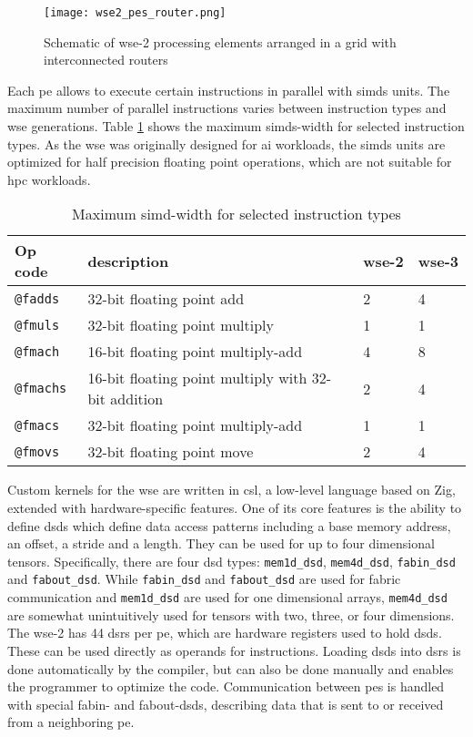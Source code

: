 \begin{figure}[h]
    \centering
    \texttt{[image: wse2\_pes\_router.png]}
    \caption{Schematic of \ac{wse}-2 processing elements arranged in a grid with interconnected routers \cite{lie2023cerebras}}
    \label{fig:wse2_pes_router}
\end{figure}

Each \ac{pe} allows to execute certain instructions in parallel with \acp{simd} units. The maximum number of parallel instructions varies between instruction types and \ac{wse} generations. Table \ref{tab:simd_operations} shows the maximum \acp{simd}-width for selected instruction types. As the \ac{wse} was originally designed for \ac{ai} workloads, the \acp{simd} units are optimized for half precision floating point operations, which are not suitable for \ac{hpc} workloads. 

\begin{table}[h]
    \centering
    \caption{Maximum \ac{simd}-width for selected instruction types}
    \label{tab:simd_operations}
    \begin{tabular}{@{}llll@{}}
        \toprule
        Op code & description & \ac{wse}-2 & \ac{wse}-3 \\
        \midrule
        \texttt{@fadds} & 32-bit floating point add & 2 & 4 \\
        \texttt{@fmuls} & 32-bit floating point multiply & 1 & 1 \\
        \texttt{@fmach} & 16-bit floating point multiply-add & 4 & 8 \\
        \texttt{@fmachs} & 16-bit floating point multiply with 32-bit addition & 2 & 4 \\
        \texttt{@fmacs} & 32-bit floating point multiply-add & 1 & 1 \\
        \texttt{@fmovs} & 32-bit floating point move & 2 & 4 \\
        \bottomrule
    \end{tabular}
\end{table}

Custom kernels for the \ac{wse} are written in \ac{csl}, a low-level language based on Zig, extended with hardware-specific features.
One of its core features is the ability to define \acp{dsd} which define data access patterns including a base memory address, an offset, a stride and a length. They can be used for up to four dimensional tensors. Specifically, there are four \ac{dsd} types: \texttt{mem1d\_dsd}, \texttt{mem4d\_dsd}, \texttt{fabin\_dsd} and \texttt{fabout\_dsd}. While \texttt{fabin\_dsd} and \texttt{fabout\_dsd} are used for fabric communication and \texttt{mem1d\_dsd} are used for one dimensional arrays, \texttt{mem4d\_dsd} are somewhat unintuitively used for tensors with two, three, or four dimensions. The \ac{wse}-2 has 44 \acp{dsr} per \ac{pe}, which are hardware registers used to hold \acp{dsd}. These can be used directly as operands for instructions. Loading \acp{dsd} into \acp{dsr} is done automatically by the compiler, but can also be done manually and enables the programmer to optimize the code. Communication between \acp{pe} is handled with special fabin- and fabout-\acp{dsd}, describing data that is sent to or received from a neighboring \ac{pe}.

